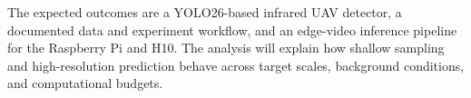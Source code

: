 The expected outcomes are a YOLO26-based infrared UAV detector, a documented data and experiment workflow, and an edge-video inference pipeline for the Raspberry Pi and H10. The analysis will explain how shallow sampling and high-resolution prediction behave across target scales, background conditions, and computational budgets.
